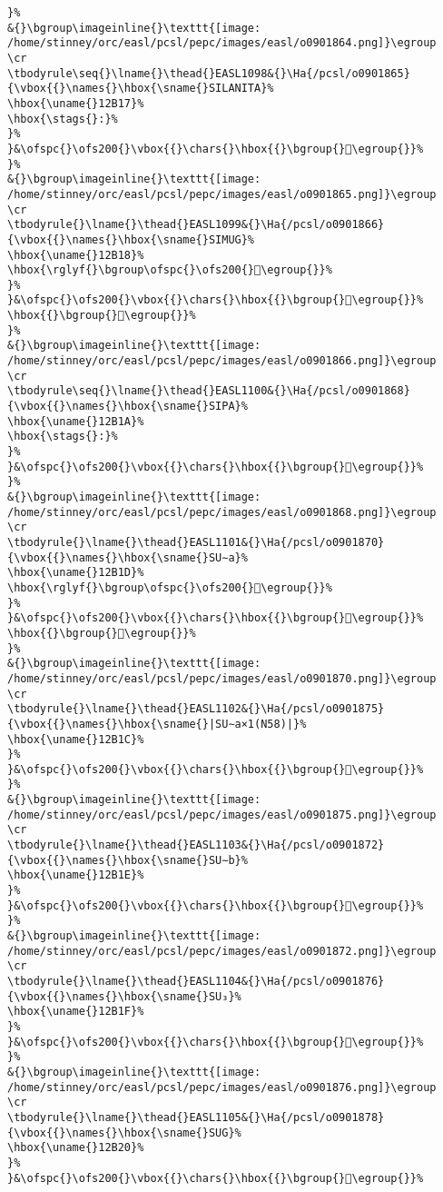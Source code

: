 \begin{verbatim}
}%
&{}\bgroup\imageinline{}\texttt{[image: /home/stinney/orc/easl/pcsl/pepc/images/easl/o0901864.png]}\egroup
\cr
\tbodyrule\seq{}\lname{}\thead{}EASL1098&{}\Ha{/pcsl/o0901865}{\vbox{{}\names{}\hbox{\sname{}SILANITA}%
\hbox{\uname{}12B17}%
\hbox{\stags{}:}%
}%
}&\ofspc{}\ofs200{}\vbox{{}\chars{}\hbox{{}\bgroup{}𒬗\egroup{}}%
}%
&{}\bgroup\imageinline{}\texttt{[image: /home/stinney/orc/easl/pcsl/pepc/images/easl/o0901865.png]}\egroup
\cr
\tbodyrule{}\lname{}\thead{}EASL1099&{}\Ha{/pcsl/o0901866}{\vbox{{}\names{}\hbox{\sname{}SIMUG}%
\hbox{\uname{}12B18}%
\hbox{\rglyf{}\bgroup\ofspc{}\ofs200{}𒬘\egroup{}}%
}%
}&\ofspc{}\ofs200{}\vbox{{}\chars{}\hbox{{}\bgroup{}𒬘\egroup{}}%
\hbox{{}\bgroup{}𒬙\egroup{}}%
}%
&{}\bgroup\imageinline{}\texttt{[image: /home/stinney/orc/easl/pcsl/pepc/images/easl/o0901866.png]}\egroup
\cr
\tbodyrule\seq{}\lname{}\thead{}EASL1100&{}\Ha{/pcsl/o0901868}{\vbox{{}\names{}\hbox{\sname{}SIPA}%
\hbox{\uname{}12B1A}%
\hbox{\stags{}:}%
}%
}&\ofspc{}\ofs200{}\vbox{{}\chars{}\hbox{{}\bgroup{}𒬚\egroup{}}%
}%
&{}\bgroup\imageinline{}\texttt{[image: /home/stinney/orc/easl/pcsl/pepc/images/easl/o0901868.png]}\egroup
\cr
\tbodyrule{}\lname{}\thead{}EASL1101&{}\Ha{/pcsl/o0901870}{\vbox{{}\names{}\hbox{\sname{}SU∼a}%
\hbox{\uname{}12B1D}%
\hbox{\rglyf{}\bgroup\ofspc{}\ofs200{}𒬝\egroup{}}%
}%
}&\ofspc{}\ofs200{}\vbox{{}\chars{}\hbox{{}\bgroup{}𒬛\egroup{}}%
\hbox{{}\bgroup{}𒬝\egroup{}}%
}%
&{}\bgroup\imageinline{}\texttt{[image: /home/stinney/orc/easl/pcsl/pepc/images/easl/o0901870.png]}\egroup
\cr
\tbodyrule{}\lname{}\thead{}EASL1102&{}\Ha{/pcsl/o0901875}{\vbox{{}\names{}\hbox{\sname{}|SU∼a×1(N58)|}%
\hbox{\uname{}12B1C}%
}%
}&\ofspc{}\ofs200{}\vbox{{}\chars{}\hbox{{}\bgroup{}𒬜\egroup{}}%
}%
&{}\bgroup\imageinline{}\texttt{[image: /home/stinney/orc/easl/pcsl/pepc/images/easl/o0901875.png]}\egroup
\cr
\tbodyrule{}\lname{}\thead{}EASL1103&{}\Ha{/pcsl/o0901872}{\vbox{{}\names{}\hbox{\sname{}SU∼b}%
\hbox{\uname{}12B1E}%
}%
}&\ofspc{}\ofs200{}\vbox{{}\chars{}\hbox{{}\bgroup{}𒬞\egroup{}}%
}%
&{}\bgroup\imageinline{}\texttt{[image: /home/stinney/orc/easl/pcsl/pepc/images/easl/o0901872.png]}\egroup
\cr
\tbodyrule{}\lname{}\thead{}EASL1104&{}\Ha{/pcsl/o0901876}{\vbox{{}\names{}\hbox{\sname{}SU₃}%
\hbox{\uname{}12B1F}%
}%
}&\ofspc{}\ofs200{}\vbox{{}\chars{}\hbox{{}\bgroup{}𒬟\egroup{}}%
}%
&{}\bgroup\imageinline{}\texttt{[image: /home/stinney/orc/easl/pcsl/pepc/images/easl/o0901876.png]}\egroup
\cr
\tbodyrule{}\lname{}\thead{}EASL1105&{}\Ha{/pcsl/o0901878}{\vbox{{}\names{}\hbox{\sname{}SUG}%
\hbox{\uname{}12B20}%
}%
}&\ofspc{}\ofs200{}\vbox{{}\chars{}\hbox{{}\bgroup{}𒬠\egroup{}}%

\end{verbatim}
